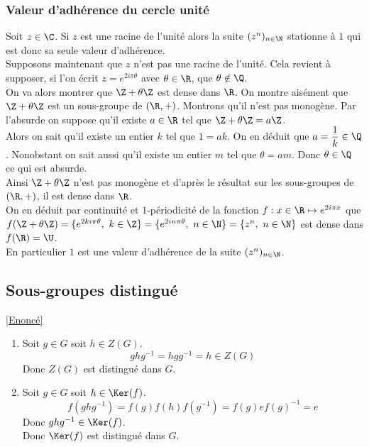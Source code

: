\documentclass[8pt]{book}
\begin{document}
	\subsubsection{Valeur d'adhérence du cercle unité }
	Soit $z\in \C$. Si $z$ est une racine de l'unité alors la suite $(z^n)_{n\in \N}$ stationne à $1$ qui est donc sa seule valeur d'adhérence.\\
	Supposons maintenant que $z$ n'est pas une racine de l'unité. Cela revient à supposer, si l'on écrit $z=e^{2i\pi\theta}$ avec $\theta\in \R$, que $\theta\notin\Q$.\\
	On va alors montrer que $\Z+\theta\Z$ est dense dans $\R$. On montre aisément que $\Z+\theta\Z$ est un sous-groupe de $(\R,+)$. Montrons qu'il n'est pas monogène. Par l'absurde on suppose qu'il existe $a\in \R$ tel que $\Z+\theta\Z=a\Z$.\\
	Alors on sait qu'il existe un entier $k$ tel que $1=ak$. On en déduit que $a=\displaystyle\frac{1}{k}\in \Q$. Nonobstant on sait aussi qu'il existe un entier $m$ tel que $\theta=am$. Donc $\theta\in \Q$ ce qui est absurde.\\
	Ainsi $\Z+\theta\Z$ n'est pas monogène et d'après le résultat sur les sous-groupes de $(\R,+)$, il est dense dans $\R$.\\
	On en déduit par continuité et $1$-périodicité de la fonction $f:x\in \R\mapsto e^{2i\pi x}$ que $f(\Z+\theta\Z)=\{e^{2ki\pi\theta},\ k\in \Z\}=\{e^{2in\pi\theta},\ n\in \N\}=\{z^n,\ n\in \N\}$ est dense dans $f(\R)=\U$.\\
	En particulier $1$ est une valeur d'adhérence de la suite $(z^n)_{n\in \N}$.
	
	\subsection{Sous-groupes distingué }
	\label{Sous-groupes distingué corrigé}
	\textcolor{blue}{\hyperref[Sous-groupes distingués]{[Enoncé]}}\\
	\begin{enumerate}[leftmargin=*]
		\item Soit $g\in G$ soit $h\in Z(G)$. \[ghg^{-1}=hgg^{-1}=h\in Z(G)\]
		Donc $Z(G)$ est distingué dans $G$.
		\item Soit $g\in G$ soit $h\in \Ker(f)$. \[f(ghg^{-1})=f(g)f(h)f(g^{-1})=f(g)ef(g)^{-1}=e\]
		Donc $ghg^{-1}\in \Ker(f)$.\\
		Donc $\Ker(f)$ est distingué dans $G$.
	\end{enumerate}
	
\end{document}
